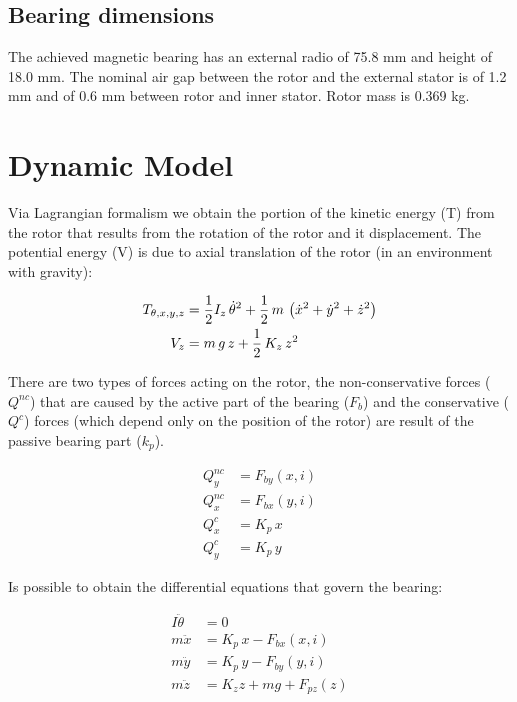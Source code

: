 \documentclass[10pt,fleqn,a4paper,twoside]{article}
\begin{document}
	\subsection{Bearing dimensions}
	
	The achieved magnetic bearing has an external radio of 75.8 mm and height of 18.0 mm. The nominal air gap between the rotor and the external stator is of 1.2 mm and of 0.6 mm between rotor and inner stator. Rotor mass is 0.369 kg.
	
	
	\section{Dynamic Model}
	
	Via Lagrangian formalism we obtain the portion of the kinetic energy (T) from the rotor that results from the rotation of the rotor and it displacement. The potential energy (V) is due to axial translation of the rotor (in an environment with gravity): 
	
	\begin{align}
		T_{\theta, x, y, z} &= \frac{1}{2} I_z \, \dot{\theta}^2 + \frac{1}{2} \, m \, \left( \dot{x}^2 + \dot{y}^2 + \dot{z}^2 \right) \notag \\
		V_z &= m \, g \, z + \frac{1}{2} \, K_z \, z^2
	\end{align}
	
	There are two types of forces acting on the rotor, the  non-conservative forces ($Q^{nc}$) that are caused by the active part of the bearing ($F_b$) and the conservative ($Q^{c}$) forces (which depend only on the position of the rotor) are result of the passive bearing part ($k_p$). 
	
	\begin{align}
		Q_y^{nc} &= F_{by}(x,i)  \\
		Q_x^{nc} &= F_{bx}(y,i)  \\
		Q^{c}_x &= K_p \, x \\
		Q^{c}_y &= K_p \, y 
	\end{align}
	
	Is possible to obtain the differential equations that govern the bearing:
		
	\begin{align}
		I \ddot{\theta} &= 0 \\
		m \ddot{x}		&= K_p \, x  - F_{bx}(x,i) \\
		m \ddot{y}		&= K_p \, y  - F_{by}(y,i)\\	
		m \ddot{z}  	&= K_z z + m g  + F_{pz}(z)
	\end{align}
	
\end{document}
